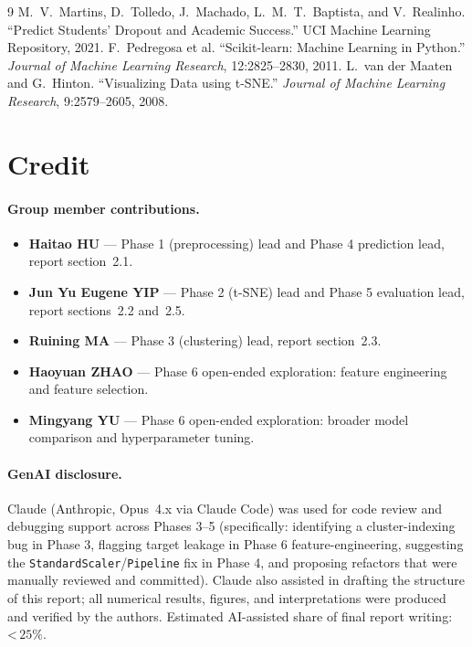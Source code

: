 \documentclass[11pt]{article}
\begin{document}
\begin{thebibliography}{9}
    M.~V.~Martins, D.~Tolledo, J.~Machado, L.~M.~T.~Baptista,
    and V.~Realinho. ``Predict Students' Dropout and Academic
    Success.'' UCI Machine Learning Repository, 2021.
    F.~Pedregosa et al. ``Scikit-learn: Machine Learning in Python.''
    \emph{Journal of Machine Learning Research}, 12:2825--2830, 2011.
    L.~van der Maaten and G.~Hinton. ``Visualizing Data using
    t-SNE.'' \emph{Journal of Machine Learning Research},
    9:2579--2605, 2008.
\end{thebibliography}

\section*{Credit}

\paragraph{Group member contributions.}
\begin{itemize}
  \item \textbf{Haitao HU} --- Phase 1 (preprocessing) lead and
        Phase 4 prediction lead,
        report section~2.1.
  \item \textbf{Jun Yu Eugene YIP} --- Phase 2 (t-SNE) lead and
        Phase 5 evaluation lead, report
        sections~2.2 and~2.5.
  \item \textbf{Ruining MA} --- Phase 3 (clustering) lead, report
        section~2.3.
  \item \textbf{Haoyuan ZHAO} --- Phase 6 open-ended exploration:
        feature engineering and feature selection.
  \item \textbf{Mingyang YU} --- Phase 6 open-ended exploration:
        broader model comparison and hyperparameter tuning.
\end{itemize}

\paragraph{GenAI disclosure.}
Claude (Anthropic, Opus~4.x via Claude Code) was used for code
review and debugging support across Phases 3--5 (specifically:
identifying a cluster-indexing bug in Phase 3, flagging target
leakage in Phase 6 feature-engineering, suggesting the
\texttt{StandardScaler}/\texttt{Pipeline} fix in Phase 4, and
proposing refactors that were manually reviewed and committed).
Claude also assisted in drafting the structure of this report; all
numerical results, figures, and interpretations were produced and
verified by the authors. Estimated AI-assisted share of final report
writing: \textless\,$25\%$.
\end{document}
